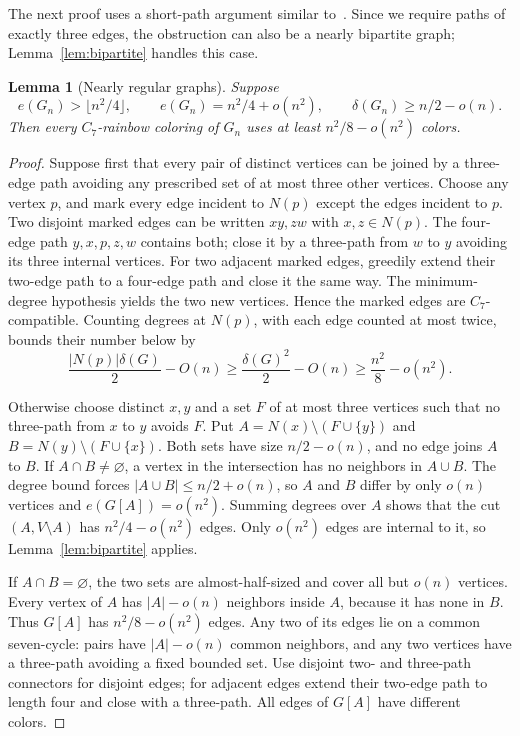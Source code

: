 \documentclass[10pt]{article}
\newtheorem{lem}[thm]{Lemma}
\theoremstyle{remark}
\begin{document}
The next proof uses a short-path argument similar to~\cite[Claim~2 in Section~4]{BCM}. Since we require paths of exactly three edges, the obstruction can also be a nearly bipartite graph; Lemma~\ref{lem:bipartite} handles this case.

\begin{lem}[Nearly regular graphs]\label{lem:regular}
Suppose
\[
 e(G_n)>\lfloor n^2/4\rfloor,\qquad e(G_n)=n^2/4+o(n^2),\qquad
 \delta(G_n)\ge n/2-o(n).
\]
Then every $C_7$-rainbow coloring of $G_n$ uses at least $n^2/8-o(n^2)$ colors.
\end{lem}
\begin{proof}
Suppose first that every pair of distinct vertices can be joined by a three-edge path avoiding any prescribed set of at most three other vertices. Choose any vertex $p$, and mark every edge incident to $N(p)$ except the edges incident to $p$. Two disjoint marked edges can be written $xy,zw$ with $x,z\in N(p)$. The four-edge path $y,x,p,z,w$ contains both; close it by a three-path from $w$ to $y$ avoiding its three internal vertices. For two adjacent marked edges, greedily extend their two-edge path to a four-edge path and close it the same way. The minimum-degree hypothesis yields the two new vertices. Hence the marked edges are $C_7$-compatible. Counting degrees at $N(p)$, with each edge counted at most twice, bounds their number below by
\[
 \frac{|N(p)|\delta(G)}2-O(n)
 \ge\frac{\delta(G)^2}{2}-O(n)
 \ge\frac{n^2}{8}-o(n^2).
\]

Otherwise choose distinct $x,y$ and a set $F$ of at most three vertices such that no three-path from $x$ to $y$ avoids $F$. Put $A=N(x)\setminus(F\cup\{y\})$ and $B=N(y)\setminus(F\cup\{x\})$. Both sets have size $n/2-o(n)$, and no edge joins $A$ to $B$. If $A\cap B\ne\varnothing$, a vertex in the intersection has no neighbors in $A\cup B$. The degree bound forces $|A\cup B|\le n/2+o(n)$, so $A$ and $B$ differ by only $o(n)$ vertices and $e(G[A])=o(n^2)$. Summing degrees over $A$ shows that the cut $(A,V\setminus A)$ has $n^2/4-o(n^2)$ edges. Only $o(n^2)$ edges are internal to it, so Lemma~\ref{lem:bipartite} applies.

If $A\cap B=\varnothing$, the two sets are almost-half-sized and cover all but $o(n)$ vertices. Every vertex of $A$ has $|A|-o(n)$ neighbors inside $A$, because it has none in $B$. Thus $G[A]$ has $n^2/8-o(n^2)$ edges. Any two of its edges lie on a common seven-cycle: pairs have $|A|-o(n)$ common neighbors, and any two vertices have a three-path avoiding a fixed bounded set. Use disjoint two- and three-path connectors for disjoint edges; for adjacent edges extend their two-edge path to length four and close with a three-path. All edges of $G[A]$ have different colors.
\end{proof}
\end{document}
